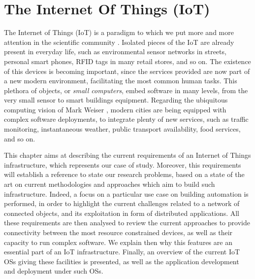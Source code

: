 \chapter{The Internet Of Things (IoT)}
\label{ch:IoT}

The Internet of Things (IoT) is a paradigm to which we put more and more attention in the scientific community \cite{atzori2010iotsurvey}.
Isolated pieces of the IoT are already present in everyday life, such as environmental sensor networks in streets, personal smart phones, RFID tags in many retail stores, and so on.
The existence of this devices is becoming important, since the services provided are now part of a new modern environment, facilitating the most common human tasks.
This plethora of objects, or \textit{small computers}, embed software in many levels, from the very small sensor to smart buildings equipment.
Regarding the ubiquitous computing vision of Mark Weiser \cite{weiser1999ubiquitous}, modern cities are being equipped with complex software deployments, to integrate plenty of new services, such as traffic monitoring, instantaneous weather, public transport availability, food services, and so on.

This chapter aims at describing the current requirements of an Internet of Things infrastructure, which represents our case of study.
Moreover, this requirements will establish a reference to state our research problems, based on a state of the art on current methodologies and approaches which aim to build such infrastructure.
Indeed, a focus on a particular use case on building automation is performed, in order to highlight the current challenges related to a network of connected objects, and its exploitation in form of distributed applications.
All these requirements are then analysed to review the current approaches to provide connectivity between the most resource constrained devices, as well as their capacity to run complex software.
We explain then why this features are an essential part of an IoT infrastructure.
Finally, an overview of the current IoT OSs giving these facilities is presented, as well as the application development and deployment under such OSs.


